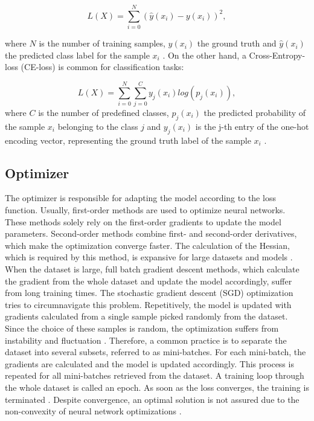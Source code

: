 \begin{equation}
L(X) =  \sum_{i=0}^{N}(\hat{y}(x_{i})-y(x_{i}))^2,
\end{equation}

where $N$ is the number of training samples, $y(x_{i})$ the ground truth and $\hat{y}(x_{i})$ the predicted class label for the sample $x_{i}$ \cite{Calin2020}. On the other hand, a Cross-Entropy-loss (CE-loss) is common for classification tasks: 

\begin{equation}
L(X) = \sum_{i=0}^{N} \sum_{j=0}^{C} y_{j}(x_{i}) log(p_{j}(x_{i})),
\end{equation}
where $C$ is the number of predefined classes, $p_{j}(x_{i})$ the predicted probability of the sample $x_{i}$ belonging to the class $j$ and $y_{j}(x_{i})$ is the j-th entry of the one-hot encoding vector, representing the ground truth label of the sample $x_{i}$ \cite{ShilohPerl2020}.



\subsection{Optimizer}
The optimizer is responsible for adapting the model according to the loss function. Usually, first-order methods are used to optimize neural networks. These methods solely rely on the first-order gradients to update the model parameters. Second-order methods combine first- and second-order derivatives, which make the optimization converge faster. The calculation of the Hessian, which is required by this method, is expansive for large datasets and models \cite{Calin2020}\cite{ShilohPerl2020}. When the dataset is large, full batch gradient descent methods, which calculate the gradient from the whole dataset and update the model accordingly, suffer from long training times. The stochastic gradient descent (SGD) optimization tries to circumnavigate this problem. Repetitively, the model is updated with gradients calculated from a single sample picked randomly from the dataset. Since the choice of these samples is random, the optimization suffers from instability and fluctuation \cite{ShilohPerl2020}. Therefore, a common practice is to separate the dataset into several subsets, referred to as mini-batches. For each mini-batch, the gradients are calculated and the model is updated accordingly. This process is repeated for all mini-batches retrieved from the dataset. A training loop through the whole dataset is called an epoch. As soon as the loss converges, the training is terminated \cite{ShilohPerl2020}. Despite convergence, an optimal solution is not assured due to the non-convexity of neural network optimizations \cite{ShilohPerl2020}.

